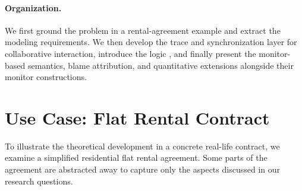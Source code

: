 \paragraph{Organization.}

We first ground the problem in a rental-agreement example and extract the modeling requirements. We then develop the trace and synchronization layer for collaborative interaction, introduce the logic \cDL, and finally present the monitor-based semantics, blame attribution, and quantitative extensions alongside their monitor constructions.



\section{Use Case: Flat Rental Contract}

\label{sec:motivating-example}



To illustrate the theoretical development in a concrete real-life contract, we examine a simplified residential flat rental agreement. Some parts of the agreement are abstracted away to capture only the aspects discussed in our research questions. 



